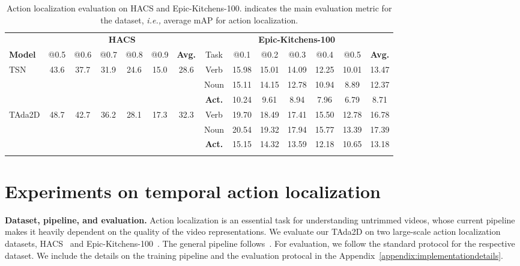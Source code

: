 \documentclass{article} \usepackage{iclr2022_conference,times}
\newcommand{\tablestyle}[2]{\setlength{\tabcolsep}{#1}\renewcommand{\arraystretch}{#2}\centering\small}
\begin{document}
\newcommand{\hacs}[1]{\multirow{3}{*}{#1}}
\begin{table}[t]
\caption{Action localization evaluation on HACS and Epic-Kitchens-100.  indicates the main evaluation metric for the dataset, \textit{i.e.,} average mAP for action localization.}
\centering
\vspace{-1mm}
\tablestyle{3pt}{1.0}
\begin{tabular}{lccccccccccccc}
\shline
~ & \multicolumn{6}{c}{\bf HACS} & \multicolumn{7}{c}{\bf Epic-Kitchens-100} \\
\cmidrule(r){2-7} \cmidrule(r){8-14}
\bf Model & @0.5 & @0.6 & @0.7 & @0.8 & @0.9 & \bf Avg. & Task & @0.1 & @0.2 & @0.3 & @0.4 & @0.5 & \bf Avg. \\
\hline
\multirow{3}{*}{TSN} & \hacs{43.6} & \hacs{37.7} & \hacs{31.9} & \hacs{24.6} & \hacs{15.0} & \hacs{28.6} & Verb & 15.98 & 15.01 & 14.09 & 12.25 & 10.01 & 13.47\\
~ & ~ & ~ & ~ & ~ & ~ & ~ & Noun &15.11 & 14.15 & 12.78 & 10.94 & 8.89 & 12.37\\
~ & ~ & ~ & ~ & ~ & ~ & ~ & \bf Act. & 10.24 & 9.61 & 8.94 & 7.96 & 6.79 & 8.71\\
\hline
\multirow{3}{*}{TAda2D} & \hacs{48.7} & \hacs{42.7} & \hacs{36.2} & \hacs{28.1} & \hacs{17.3} & \hacs{32.3} & Verb & 19.70 & 18.49 & 17.41 & 15.50 & 12.78 & 16.78 \\
~ & ~ & ~ & ~ & ~ & ~ & ~ & Noun & 20.54 & 19.32 & 17.94 & 15.77 & 13.39 & 17.39 \\
~ & ~ & ~ & ~ & ~ & ~ & ~ & \bf Act. & 15.15 & 14.32 & 13.59 & 12.18 & 10.65 & 13.18 \\
\shline
\end{tabular}
\label{tab:localization}
\vspace{-4mm}
\end{table}

\section{Experiments on temporal action localization}
\label{sec:exp-tal}

\textbf{Dataset, pipeline, and evaluation.} 
Action localization is an essential task for understanding untrimmed videos, whose current pipeline makes it heavily dependent on the quality of the video representations.
We evaluate our TAda2D on two large-scale action localization datasets, HACS~\citep{hacs} and Epic-Kitchens-100~\citep{ek100}.
The general pipeline follows~\citep{ek100,ek100actionlocalization,hacscompetition}.
For evaluation, we follow the standard protocol for the respective dataset.
We include the details on the training pipeline and the evaluation protocal in the Appendix~\ref{appendix:implementationdetails}.
\end{document}

